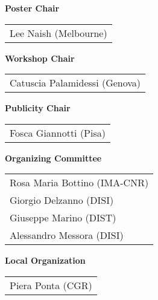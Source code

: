 {\begin{tabular}{l}
\end{tabular}
%
{\center\bf Poster Chair} \\
\begin{tabular}{l}
Lee Naish (Melbourne) \\
\end{tabular}
%
{\center\bf Workshop Chair} \\
\begin{tabular}{l}
Catuscia Palamidessi (Genova) \\
\end{tabular}
%
{\center\bf Publicity Chair} \\ 
\begin{tabular}{l}
Fosca Giannotti (Pisa) \\
\end{tabular}
%
{\center\bf Organizing Committee} \\ 
\begin{tabular}{l}
Rosa Maria Bottino (IMA-CNR) \\
Giorgio Delzanno (DISI) \\
Giuseppe Marino (DIST) \\
Alessandro Messora (DISI) \\
\end{tabular}
%
{\center\bf Local Organization} \\ 
\begin{tabular}{l}
Piera Ponta (CGR) \\
\end{tabular}
}
\ $\; \;$ \
